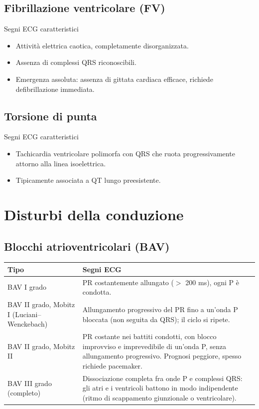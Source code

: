 \documentclass[11pt,a4paper]{article}
\begin{document}
\subsection{Fibrillazione ventricolare (FV)}
\begin{keybox}{Segni ECG caratteristici}
\begin{itemize}[leftmargin=1.2em]
  \item Attività elettrica caotica, completamente disorganizzata.
  \item Assenza di complessi QRS riconoscibili.
  \item Emergenza assoluta: assenza di gittata cardiaca efficace, richiede defibrillazione immediata.
\end{itemize}
\end{keybox}

\subsection{Torsione di punta}
\begin{keybox}{Segni ECG caratteristici}
\begin{itemize}[leftmargin=1.2em]
  \item Tachicardia ventricolare polimorfa con QRS che ruota progressivamente attorno alla linea isoelettrica.
  \item Tipicamente associata a QT lungo preesistente.
\end{itemize}
\end{keybox}

\section{Disturbi della conduzione}

\subsection{Blocchi atrioventricolari (BAV)}

\begin{tabularx}{\textwidth}{@{}l X@{}}
\toprule
\textbf{Tipo} & \textbf{Segni ECG} \\
\midrule
BAV I grado & PR costantemente allungato ($>$ 200 ms), ogni P è condotta. \\[0.4em]
BAV II grado, Mobitz I (Luciani--Wenckebach) & Allungamento progressivo del PR fino a un'onda P bloccata (non seguita da QRS); il ciclo si ripete. \\[0.4em]
BAV II grado, Mobitz II & PR costante nei battiti condotti, con blocco improvviso e imprevedibile di un'onda P, senza allungamento progressivo. Prognosi peggiore, spesso richiede pacemaker. \\[0.4em]
BAV III grado (completo) & Dissociazione completa fra onde P e complessi QRS: gli atri e i ventricoli battono in modo indipendente (ritmo di scappamento giunzionale o ventricolare). \\
\bottomrule
\end{tabularx}
\end{document}
